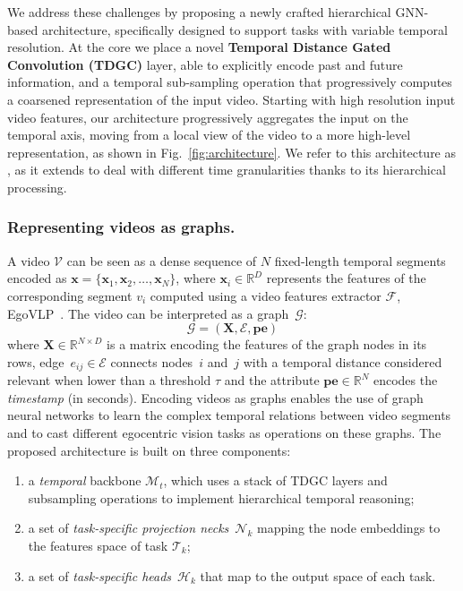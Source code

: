 We address these challenges by proposing a newly crafted hierarchical GNN-based architecture, specifically designed to support tasks with variable temporal resolution.
At the core we place a novel \textbf{Temporal Distance Gated Convolution (TDGC)} layer, able to explicitly encode past and future information, and a temporal sub-sampling operation that progressively computes a coarsened representation of the input video.
% 
Starting with high resolution input video features, our architecture progressively aggregates the input on the temporal axis, moving from a local view of the video to a more high-level representation, as shown in Fig.~\ref{fig:architecture}.
%
We refer to this architecture as \ours, as it extends \ourscvpr to deal with different time granularities thanks to its hierarchical processing.

\subsubsection{Representing videos as graphs.}
%
A video $\mathcal{V}$ can be seen as a dense sequence of $N$ fixed-length temporal segments encoded as $\mathbf{x} = \{\mathbf{x}_1, \mathbf{x}_2, \dots, \mathbf{x}_N \}$, where $\mathbf{x}_i \in \mathbb{R}^D$ represents the features of the corresponding segment $v_i$ computed using a video features extractor $\mathcal{F}$, \eg EgoVLP~\cite{lin2022egocentric}.
%
The video can be interpreted as a graph~$\mathcal{G}$:
\begin{equation}
    \mathcal{G} = (\mathbf{X}, \mathcal{E}, \mathbf{pe})
\end{equation}
where $\mathbf{X} \in \mathbb{R}^{N \times D}$ is a matrix encoding the features of the graph nodes in its rows,
edge~$e_{ij} \in \mathcal{E}$ connects nodes~$i$ and~$j$ with a temporal distance considered relevant when lower than a threshold $\tau$ and the attribute $\mathbf{pe} \in \mathbb{R}^{N}$ encodes the \emph{timestamp} (in seconds).
% 
Encoding videos as graphs enables the use of graph neural networks to learn the complex temporal relations between video segments and to cast different egocentric vision tasks as operations on these graphs. The proposed architecture is built on three components:
\begin{enumerate}
    \item a \emph{temporal} backbone $\mathcal{M}_{t}$, which uses a stack of TDGC layers and subsampling operations to implement hierarchical temporal reasoning;
    \item a set of \emph{task-specific projection necks}~$\mathcal{N}_k$ mapping the node embeddings to the features space of task $\mathcal{T}_k$;
    \item a set of \emph{task-specific heads}~$\mathcal{H}_k$ that map to the output space of each task.
\end{enumerate}
